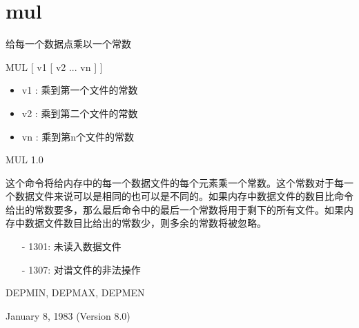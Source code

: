 \section{mul}
\label{cmd:mul}

给每一个数据点乘以一个常数

MUL [ v1 [ v2 ... vn ] ]

\begin{itemize}
\item v1 :  乘到第一个文件的常数 
\item v2 :  乘到第二个文件的常数 
\item vn : 乘到第n个文件的常数 
\end{itemize}

MUL 1.0

这个命令将给内存中的每一个数据文件的每个元素乘一个常数。这个常数对于每一个数据文件来说可以是相同的也可以是不同的。如果内存中数据文件的数目比命令给出的常数要多，那么最后命令中的最后一个常数将用于剩下的所有文件。如果内存中数据文件数目比给出的常数少，则多余的常数将被忽略。

\begin{itemize}
\item[-]1301: 未读入数据文件
\item[-]1307: 对谱文件的非法操作
\end{itemize}

DEPMIN, DEPMAX, DEPMEN

January 8, 1983 (Version 8.0)
